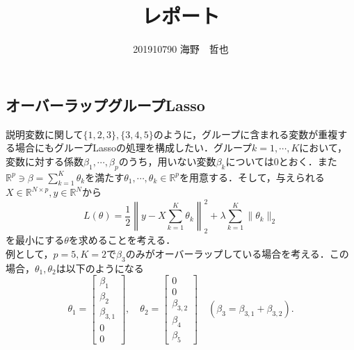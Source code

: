 \documentclass{jsarticle}
\title{レポート}
\date{}
\author{201910790 \quad 海野　哲也}
\theoremstyle{definition}
\begin{document}

\large
\setcounter{section}{3}
\setcounter{subsection}{4}
\subsection{オーバーラップグループLasso}
説明変数に関して$\{1,2,3\},\{3,4,5\}$のように，グループに含まれる変数が重複する場合にもグループLassoの処理を構成したい．グループ$k=1,\cdots,K$において，変数に対する係数$\beta_1,\cdots,\beta_p$のうち，用いない変数$\beta_k$については$0$とおく．また$\mathbb{R}^p\ni\beta=\displaystyle\sum_{k=1}^K\theta_k$を満たす$\theta_1,\cdots,\theta_k\in \mathbb{R}^p$を用意する．そして，与えられる$X\in\mathbb{R}^{N\times p},y\in\mathbb{R}^N$から
$$L(\theta)=\frac{1}{2}\left\|y-X\sum_{k=1}^K\theta_k\right\|_2^2+\lambda\sum_{k=1}^K\|\theta_k\|_2$$
を最小にする$\theta$を求めることを考える．\\

例として，$p=5,K=2$で$\beta_3$のみがオーバーラップしている場合を考える．この場合，$\theta_1,\theta_2$は以下のようになる
$$\theta_1=\left[\begin{array}{c}
\beta_1\\
\beta_2\\
\beta_{3,1}\\
0\\
0\end{array}\right],\quad \theta_2=\left[\begin{array}{c}
0\\
0\\
\beta_{3,2}\\
\beta_4\\
\beta_5\end{array}\right]\quad(\beta_3 = \beta_{3,1}+\beta_{3,2}).$$
\end{document}
